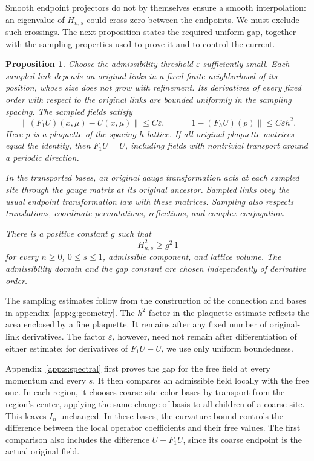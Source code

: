 \documentclass[11pt,a4paper]{article}
\newtheorem{proposition}[theorem]{Proposition}
\theoremstyle{remark}
\newcommand{\eps}{\varepsilon}
\begin{document}
Smooth endpoint projectors do not by themselves ensure a smooth
interpolation: an eigenvalue of $H_{n,s}$ could cross zero between the
endpoints. We must exclude such crossings. The next proposition states
the required uniform gap, together with the sampling properties used to
prove it and to control the current.

\begin{proposition}
\label{prop:comparison}
Choose the admissibility threshold $\eps$ sufficiently small. Each
sampled link depends on original links in a fixed finite neighborhood of
its position, whose size does not grow with refinement. Its derivatives
of every fixed order with respect to the original links are bounded
uniformly in the sampling spacing. The sampled fields satisfy
\begin{equation}
 \|(F_1U)(x,\mu)-U(x,\mu)\|\le C\eps,
 \qquad
 \|1-(F_hU)(p)\|\le C\eps h^2.
 \label{eq:refinement-estimates}
\end{equation}
Here $p$ is a plaquette of the spacing-$h$ lattice. If all original
plaquette matrices equal the identity, then $F_1U=U$, including fields
with nontrivial transport around a periodic direction.

In the transported bases, an original gauge transformation acts at each
sampled site through the gauge matrix at its original ancestor. Sampled
links obey the usual endpoint transformation law with these matrices.
Sampling also respects translations, coordinate permutations, reflections,
and complex conjugation.

There is a positive constant $g$ such that
\begin{equation}
 H_{n,s}^2\ge g^2\,1
\end{equation}
for every $n\ge0$, $0\le s\le1$, admissible component, and lattice
volume. The admissibility domain and the gap constant are chosen
independently of derivative order.
\end{proposition}

The sampling estimates follow from the construction of the connection and
bases in appendix~\ref{app:g:geometry}. The $h^2$ factor in the plaquette
estimate reflects the area enclosed by a fine plaquette. It remains after
any fixed number of original-link derivatives. The factor $\eps$, however,
need not remain after differentiation of either estimate; for derivatives
of $F_1U-U$, we use only uniform boundedness.

Appendix~\ref{app:s:spectral} first proves the gap for the free field at
every momentum and every $s$. It then compares an admissible field locally
with the free one. In each region, it chooses coarse-site color bases by
transport from the region's center, applying the same change of basis to
all children of a coarse site. This leaves $I_n$ unchanged. In these
bases, the curvature bound controls the difference between the local
operator coefficients and their free values. The first comparison also
includes the difference $U-F_1U$, since its coarse endpoint is the actual
original field.
\end{document}
